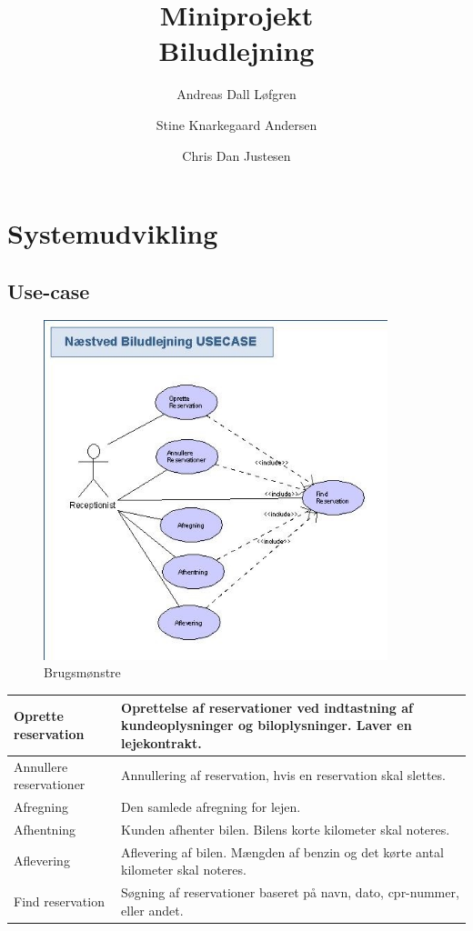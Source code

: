 \documentclass[11pt]{article}
\title%
{%
	{\large Miniprojekt}\\
	Biludlejning
}
\author%
{%
	Andreas Dall Løfgren\\
	\and
	Stine Knarkegaard Andersen\\
	\and
	Chris Dan Justesen\\
}
\begin{document}
\maketitle
\tableofcontents
\pagebreak

\section*{Systemudvikling}
\subsection*{Use-case}
\begin{figure}
  \centering
  \includegraphics[width=10cm]{Naestved_Biludlejning_USECASE.jpeg}
  \caption{Brugsmønstre}
  \label{fig:Use-case diagram}
\end{figure}

\begin{tabular}{ l | p{10cm} }
Oprette reservation & Oprettelse af reservationer ved indtastning af kundeoplysninger og biloplysninger. Laver en lejekontrakt. \\ \hline
Annullere reservationer & Annullering af reservation, hvis en reservation skal slettes. \\ \hline
Afregning & Den samlede afregning for lejen. \\ \hline
Afhentning & Kunden afhenter bilen. Bilens korte kilometer skal noteres.\\ \hline
Aflevering & Aflevering af bilen. Mængden af benzin og det kørte antal kilometer skal noteres. \\ \hline
Find reservation & Søgning af reservationer baseret på navn, dato, cpr-nummer, eller andet.
\end{tabular}\\
\end{document}
